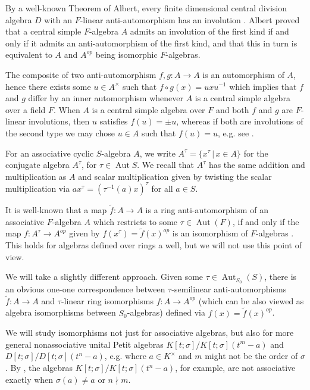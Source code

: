 \documentclass{amsart}
\theoremstyle{plain}
\theoremstyle{definition}
\numberwithin{equation}{section}
\numberwithin{figure}{section}
\DeclareMathOperator{\Aut}{Aut}
\begin{document}
 By a well-known Theorem of Albert, every finite dimensional central division algebra $D$ with
an $F$-linear anti-automorphism has an involution \cite[Theorem 7]{Lewis}. Albert proved that a central simple $F$-algebra $A$ admits an involution of the first kind if and only if it admits an anti-automorphism of the first kind, and that this in turn is equivalent to $A$ and $A^{op}$ being isomorphic $F$-algebras.


The composite of two anti-automorphism $f,g:A\to A$   is an automorphism of $A$, hence there exists some $u\in A^\times$ such that
$f\circ g(x)=uxu^{-1}$ which implies that $f$ and $g$ differ by an inner automorphism whenever $A$ is a central simple algebra over a field $F$. When $A$ is a central simple algebra over $F$ and both $f$ and $g$ are $F$-linear involutions, then $u$ satisfies $f(u)=\pm u$, whereas if both are involutions of the second type we may chose $u\in A$ such that $f(u)=u$, e.g. see \cite{KMRT}.

For an associative cyclic $S$-algebra $A$, we
 write  $A^{\tau}=\{x^{\tau}\,|\, x\in A\}$ for the conjugate algebra
 $A^{\tau}$, for $\tau\in \Aut{S}$. We recall that  $A^{\tau}$ has the same addition and multiplication as $A$ and scalar multiplication given by twisting the scalar multiplication via $a x^{\tau}=(\tau^{-1}(a)x)^{\tau}$  for all $a\in S$.


It is well-known that a map $\widetilde f:A\to A$ is a ring anti-automorphism of an associative $F$-algebra $A$ which restricts to some $\tau\in \Aut (F)$, if and only if the map $f:A^\tau\to A^{op}$
 given by $f(x^\tau)=\widetilde f(x)^{op}$ is an isomorphism of $F$-algebras \cite[p. 2]{MST}.
 This holds for algebras defined over rings a well, but we will not use this point of view.

  We will take a slightly different approach. Given some $\tau\in \Aut_{S_0}(S)$, there is an obvious one-one correspondence between $\tau$-semilinear anti-automorphisms
  $\widetilde f:A\to A$ and  $\tau$-linear ring isomorphisms  $f:A\to A^{op}$ (which can be also viewed as algebra isomorphisms between $S_0$-algebras) defined via $f(x)=\widetilde f(x)^{op}$.

We will study isomorphisms not just for associative algebras, but also for more general nonassociative unital Petit algebras  $K[t;\sigma]/K[t;\sigma](t^m-a)$ and $D[t;\sigma]/D[t;\sigma](t^n-a)$, e.g. where $a\in K^\times$ and $m$ might not be the order of $\sigma $ \cite{P66}.
 By \cite[(15)]{P66}, the algebras $K[t;\sigma]/K[t;\sigma](t^n-a)$,  for example, are not associative exactly when $\sigma(a)\neq a$ or $n\nmid m$.
\end{document}
